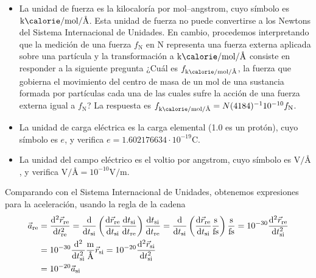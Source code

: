\documentclass{article}
\newcommand{\internationalUnitSystem}{\textnormal{si}}
\newcommand{\realUnitSystem}{\textnormal{re}}
\begin{document}
\begin{itemize}
    \item La unidad de fuerza es la kilocaloría por mol--angstrom, cuyo símbolo es \(\unit{\kilo\calorie\per\mole\per\angstrom}\).
    Esta unidad de fuerza no puede convertirse a los Newtons del Sistema Internacional de Unidades.
    En cambio, procedemos interpretando que la medición de una fuerza \(f_{\unit{\newton}}\) en \(\unit{\newton}\) representa una fuerza externa aplicada sobre una partícula y la transformación a \(\unit{\kilo\calorie\per\mole\per\angstrom}\) consiste en responder a la siguiente pregunta
    ¿Cuál es \(f_{\unit{\kilo\calorie\per\mole\per\angstrom}}\), la fuerza que gobierna el movimiento del centro de masa de un mol de una sustancia formada por partículas cada una de las cuales sufre la acción de una fuerza externa igual a \(f_{\unit{\newton}}\)?
    La respuesta es \(f_{\unit{\kilo\calorie\per\mole\per\angstrom}} = N (4184)^{- 1} 10^{- 10} f_{\unit{\newton}}\).

    \item La unidad de carga eléctrica es la carga elemental (1.0 es un protón), cuyo símbolo es \(\unit{\elementarycharge}\), y verifica \(\unit{\elementarycharge} = 1.602 176 634 \cdot 10^{- 19} \unit{\coulomb}\).

    \item La unidad del campo eléctrico es el voltio por angstrom, cuyo símbolo es \(\unit{\volt\per\angstrom}\), y verifica \(\unit{\volt\per\angstrom} = 10^{- 10} \unit{\volt\per\metre}\).
  \end{itemize}

  Comparando con el Sistema Internacional de Unidades, obtenemos expresiones
  para la aceleración, usando la regla de la cadena
  \begin{align}
    \vec{a}_{\realUnitSystem}
    &=
    \frac{\dd^2 \vec{r}_{\realUnitSystem}}{\dd t_{\realUnitSystem}^2}
    =
    \frac{\dd}{\dd t_{\internationalUnitSystem}} \left( \frac{\dd \vec{r}_\realUnitSystem}{\dd t_{\internationalUnitSystem}} \frac{\dd t_{\internationalUnitSystem}}{\dd t_\realUnitSystem} \right) \frac{\dd t_{\internationalUnitSystem}}{\dd t_{\realUnitSystem}}
    =
    \frac{\dd}{\dd t_{\internationalUnitSystem}} \left( \frac{\dd \vec{r}_\realUnitSystem}{\dd t_{\internationalUnitSystem}} \frac{\unit{\second}}{\unit{\femto\second}} \right) \frac{\unit{\second}}{\unit{\femto\second}}
    =
    10^{- 30} \frac{\dd^2 \vec{r}_{\realUnitSystem}}{\dd t_{\internationalUnitSystem}^2}
    \\
    &=
    10^{- 30} \frac{\dd^2}{\dd t_{\internationalUnitSystem}^2} \frac{\unit{\metre}}{\unit{\angstrom}} \vec{r}_{\internationalUnitSystem}   %
    =
    10^{- 20} \frac{\dd^2 \vec{r}_{\internationalUnitSystem}}{\dd t_{\internationalUnitSystem}^2}
    \\
    &=
    10^{- 20} \vec{a}_{\internationalUnitSystem}
  \end{align}
\end{document}
